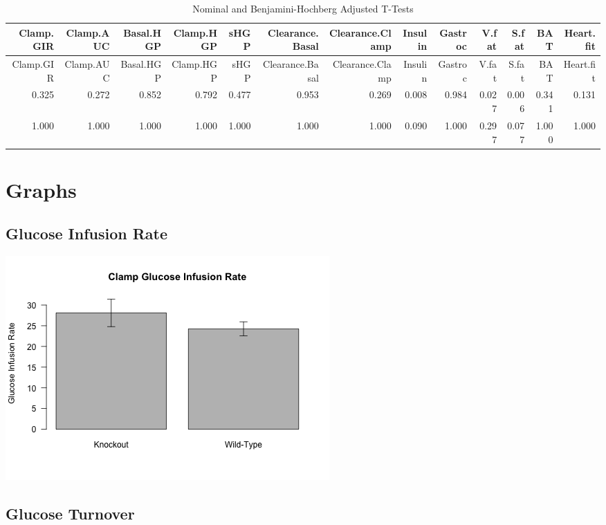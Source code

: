 \documentclass[]{article}
\begin{document}
\begin{longtable}[]{@{}rrrrrrrrrrrrr@{}}
\caption{Nominal and Benjamini-Hochberg Adjusted T-Tests}\tabularnewline
\toprule
Clamp.GIR & Clamp.AUC & Basal.HGP & Clamp.HGP & sHGP & Clearance.Basal &
Clearance.Clamp & Insulin & Gastroc & V.fat & S.fat & BAT &
Heart.fit\tabularnewline
\midrule
\endfirsthead
\toprule
Clamp.GIR & Clamp.AUC & Basal.HGP & Clamp.HGP & sHGP & Clearance.Basal &
Clearance.Clamp & Insulin & Gastroc & V.fat & S.fat & BAT &
Heart.fit\tabularnewline
\midrule
\endhead
0.325 & 0.272 & 0.852 & 0.792 & 0.477 & 0.953 & 0.269 & 0.008 & 0.984 &
0.027 & 0.006 & 0.341 & 0.131\tabularnewline
1.000 & 1.000 & 1.000 & 1.000 & 1.000 & 1.000 & 1.000 & 0.090 & 1.000 &
0.297 & 0.077 & 1.000 & 1.000\tabularnewline
\bottomrule
\end{longtable}

\section{Graphs}\label{graphs}

\subsection{Glucose Infusion Rate}\label{glucose-infusion-rate}

\includegraphics{figures/gir-1.png}

\subsection{Glucose Turnover}\label{glucose-turnover}
\end{document}
